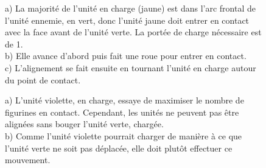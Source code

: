 \begin{figure}[!htbp]
\centering
\def\svgwidth{\columnwidth}

\caption{a) La majorité de l'unité en charge (jaune) est dans l'arc frontal de l'unité ennemie, en vert, donc l'unité jaune doit entrer en contact avec la face avant de l'unité verte. La portée de charge nécessaire est de 1{\pouce}. \\
b) Elle avance d'abord puis fait une roue pour entrer en contact. \\
c) L'alignement se fait ensuite en tournant l'unité en charge autour du point de contact.}
\label{figure/charge}
\end{figure}

\begin{figure}[!htbp]
\centering
\def\svgwidth{\columnwidth}

\caption{a) L'unité violette, en charge, essaye de maximiser le nombre de figurines en contact. Cependant, les unités ne peuvent pas être alignées sans bouger l'unité verte, chargée. \\
b) Comme l'unité violette pourrait charger de manière à ce que l'unité verte ne soit pas déplacée, elle doit plutôt effectuer ce mouvement.}
\label{figure/charge_alignement}
\end{figure}

